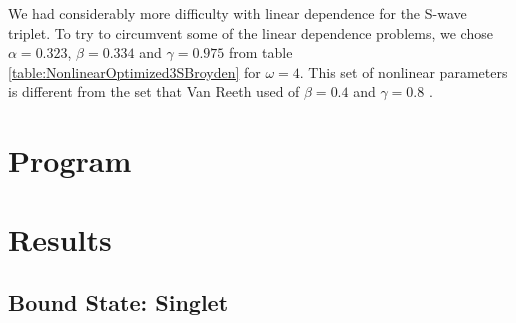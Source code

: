 \documentclass[Dissertation.tex]{subfiles}
\begin{document}
We had considerably more difficulty with linear dependence for the S-wave triplet.  To try to circumvent some of the linear dependence problems, we chose $\alpha = 0.323$, $\beta = 0.334$ and $\gamma = 0.975$ from table \ref{table:NonlinearOptimized3SBroyden} for $\omega = 4$.  This set of nonlinear parameters is different from the set that Van Reeth used of $\beta = 0.4$ and $\gamma = 0.8$ \cite{VanReeth2003}.




\section{Program}



\section{Results}


\subsection{Bound State: Singlet}
\end{document}
